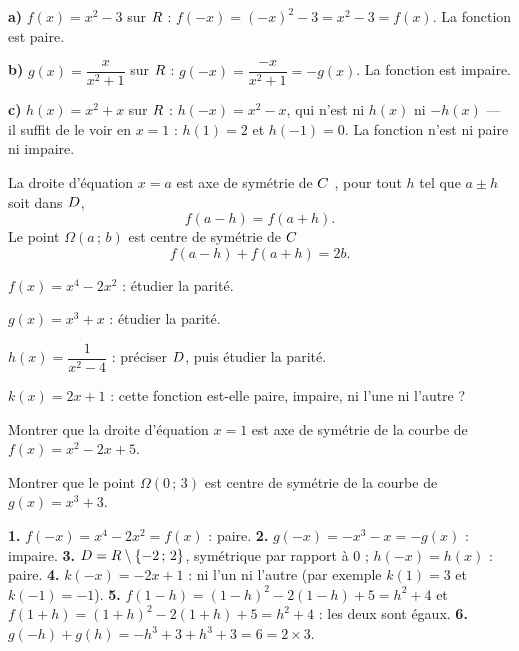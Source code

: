 \begin{exemple}
\textbf{a)} $f(x) = x^{2}-3$ sur $R$ : $f(-x) = (-x)^{2}-3 = x^{2}-3
= f(x)$. La fonction est paire.

\textbf{b)} $g(x) = \dfrac{x}{x^{2}+1}$ sur $R$ :
$g(-x) = \dfrac{-x}{x^{2}+1} = -g(x)$. La fonction est impaire.

\textbf{c)} $h(x) = x^{2}+x$ sur $R$ : $h(-x) = x^{2}-x$, qui n'est ni
$h(x)$ ni $-h(x)$ — il suffit de le voir en $x = 1$ : $h(1) = 2$ et
$h(-1) = 0$. La fonction n'est ni paire ni impaire.
\end{exemple}

\begin{propriete}
La droite d'équation $x = a$ est axe de symétrie de $C$ \ssi, pour tout
$h$ tel que $a\pm h$ soit dans $D$,
\[
  f(a-h) = f(a+h).
\]
Le point $\Omega(a\,;\,b)$ est centre de symétrie de $C$ \ssi
\[
  f(a-h)+f(a+h) = 2b .
\]
\end{propriete}

\begin{entrainement}
\exo[\niveau{1}] $f(x) = x^{4}-2x^{2}$ : étudier la parité.

\exo[\niveau{1}] $g(x) = x^{3}+x$ : étudier la parité.

\exo[\niveau{2}] $h(x) = \dfrac{1}{x^{2}-4}$ : préciser $D$, puis étudier
la parité.

\exo[\niveau{2}] $k(x) = 2x+1$ : cette fonction est-elle paire, impaire, ni
l'une ni l'autre ?

\exo[\niveau{3}] Montrer que la droite d'équation $x = 1$ est axe de
symétrie de la courbe de $f(x) = x^{2}-2x+5$.

\exo[\niveau{3}] Montrer que le point $\Omega(0\,;\,3)$ est centre de
symétrie de la courbe de $g(x) = x^{3}+3$.
\end{entrainement}

\begin{corrige}
\textbf{1.} $f(-x) = x^{4}-2x^{2} = f(x)$ : paire.
\textbf{2.} $g(-x) = -x^{3}-x = -g(x)$ : impaire.
\textbf{3.} $D = R\setminus\{-2\,;\,2\}$, symétrique par rapport à $0$ ;
$h(-x) = h(x)$ : paire.
\textbf{4.} $k(-x) = -2x+1$ : ni l'un ni l'autre (par exemple $k(1) = 3$ et
$k(-1) = -1$).
\textbf{5.} $f(1-h) = (1-h)^{2}-2(1-h)+5 = h^{2}+4$ et
$f(1+h) = (1+h)^{2}-2(1+h)+5 = h^{2}+4$ : les deux sont égaux.
\textbf{6.} $g(-h)+g(h) = -h^{3}+3+h^{3}+3 = 6 = 2\times3$.
\end{corrige}

